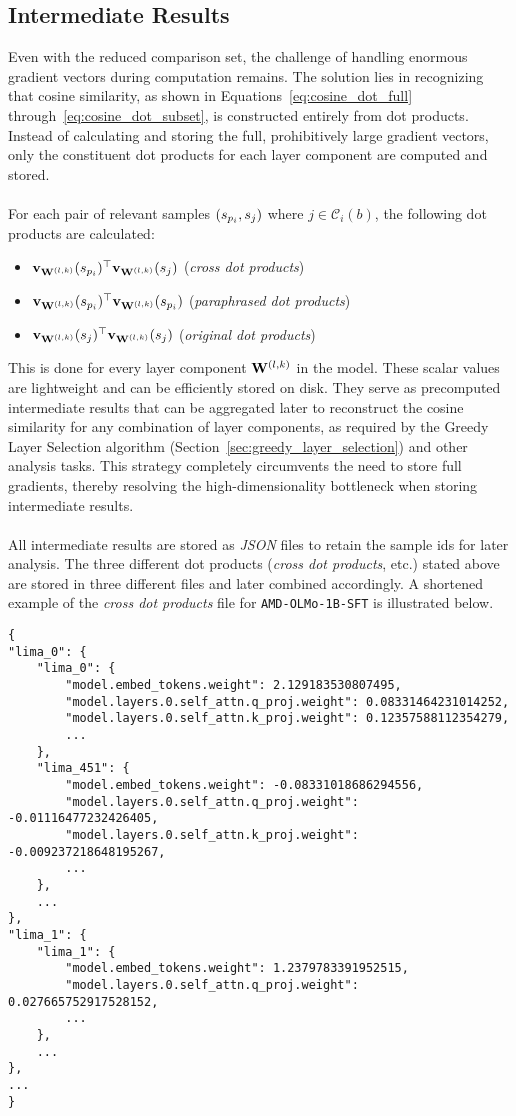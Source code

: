 \subsection{Intermediate Results}\label{subsec:intermediate_results}
Even with the reduced comparison set, the challenge of handling enormous gradient vectors during computation remains. The solution lies in recognizing that cosine similarity, as shown in Equations~\ref{eq:cosine_dot_full} through~\ref{eq:cosine_dot_subset}, is constructed entirely from dot products. Instead of calculating and storing the full, prohibitively large gradient vectors, only the constituent dot products for each layer component are computed and stored.
\\\\
For each pair of relevant samples $(\spi, \sj)$ where $j \in \mathcal{C}_i(b)$, the following dot products are calculated:
\begin{itemize}
    \item $\vXspi[\Wlk]^{\top}\vXsj[\Wlk]$ \quad (\emph{cross dot products})
    \item $\vXspi[\Wlk]^{\top}\vXspi[\Wlk]$ \quad (\emph{paraphrased dot products})
    \item $\vXsj[\Wlk]^{\top}\vXsj[\Wlk]$ \quad (\emph{original dot products})
\end{itemize}
This is done for every layer component $\Wlk$ in the model. These scalar values are lightweight and can be efficiently stored on disk. They serve as precomputed intermediate results that can be aggregated later to reconstruct the cosine similarity for any combination of layer components, as required by the Greedy Layer Selection algorithm (Section~\ref{sec:greedy_layer_selection}) and other analysis tasks. This strategy completely circumvents the need to store full gradients, thereby resolving the high-dimensionality bottleneck when storing intermediate results.
\\\\
All intermediate results are stored as \emph{JSON} files to retain the sample ids for later analysis. The three different dot products (\emph{cross dot products}, etc.) stated above are stored in three different files and later combined accordingly. A shortened example of the \emph{cross dot products} file for \texttt{AMD-OLMo-1B-SFT} is illustrated below.
\begin{verbatim}
{
"lima_0": {
    "lima_0": {
        "model.embed_tokens.weight": 2.129183530807495,
        "model.layers.0.self_attn.q_proj.weight": 0.08331464231014252,
        "model.layers.0.self_attn.k_proj.weight": 0.12357588112354279,
        ...
    },
    "lima_451": {
        "model.embed_tokens.weight": -0.08331018686294556,
        "model.layers.0.self_attn.q_proj.weight": -0.01116477232426405,
        "model.layers.0.self_attn.k_proj.weight": -0.009237218648195267,
        ...
    },
    ...
},
"lima_1": {
    "lima_1": {
        "model.embed_tokens.weight": 1.2379783391952515,
        "model.layers.0.self_attn.q_proj.weight": 0.027665752917528152,
        ...
    },
    ...
},
...
}
\end{verbatim}

